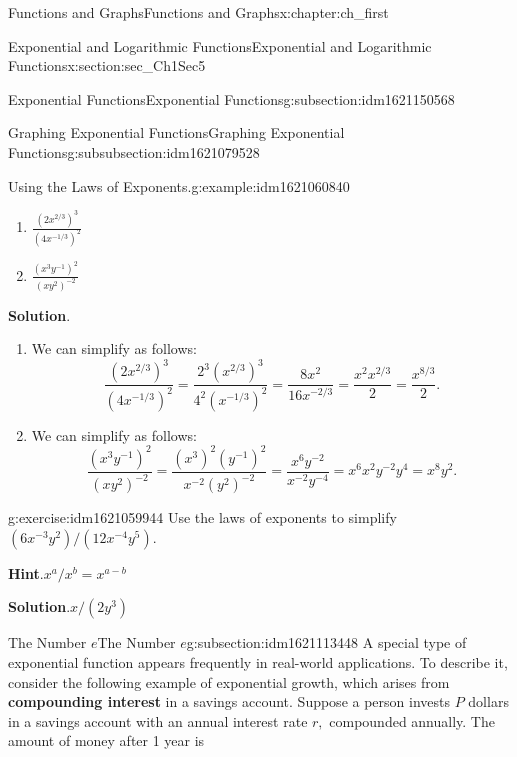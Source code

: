 \documentclass[oneside,10pt,]{book}
\newcommand{\blocktitlefont}{\relax}
\newcommand{\terminology}[1]{\textbf{#1}}
\numberwithin{equation}{section}
\begin{document}
\begin{chapterptx}{Functions and Graphs}{}{Functions and Graphs}{}{}{x:chapter:ch_first}
\begin{sectionptx}{Exponential and Logarithmic Functions}{}{Exponential and Logarithmic Functions}{}{}{x:section:sec_Ch1Sec5}
\begin{subsectionptx}{Exponential Functions}{}{Exponential Functions}{}{}{g:subsection:idm1621150568}
\begin{subsubsectionptx}{Graphing Exponential Functions}{}{Graphing Exponential Functions}{}{}{g:subsubsection:idm1621079528}
\begin{example}{Using the Laws of Exponents.}{g:example:idm1621060840}
\begin{enumerate}
\item{}\(\displaystyle \frac{(2x^{2/3})^3}{(4x^{-1/3})^2}\)%
\item{}\(\displaystyle \frac{(x^3y^{-1})^2}{(xy^2)^{-2}}\)%
\end{enumerate}
\par\smallskip%
\noindent\textbf{\blocktitlefont Solution}.\hypertarget{g:solution:idm1621056104}{}\quad{}%
\begin{enumerate}
\item{}We can simplify as follows:%
\begin{equation*}
\frac{(2x^{2/3})^3}{(4x^{-1/3})^2}= \frac{2^3(x^{2/3})^3}{4^2(x^{-1/3})^2}= \frac{8x^2}{16x^{-2/3}}= \frac{x^2x^{2/3}}{2}= \frac{x^{8/3}}{2}.
\end{equation*}
%
\item{}We can simplify as follows:%
\begin{equation*}
\frac{(x^3y^{-1})^2}{(xy^2)^{-2}}=\frac{(x^3)^2(y^{-1})^2}{x^{-2}(y^2)^{-2}}= \frac{x^6y^{-2}}{x^{-2}y^{-4}}=x^6x^2y^{-2}y^4=x^8y^2.
\end{equation*}
%
\end{enumerate}
\end{example}
\begin{inlineexercise}{}{g:exercise:idm1621059944}%
Use the laws of exponents to simplify \((6x^{-3}y^2)/(12x^{-4}y^5).\)%
\par\smallskip%
\noindent\textbf{\blocktitlefont Hint}.\hypertarget{g:hint:idm1621054824}{}\quad{}\(x^a/x^b=x^{a-b}\)%
\par\smallskip%
\noindent\textbf{\blocktitlefont Solution}.\hypertarget{g:solution:idm1621053672}{}\quad{}\(x/(2y^3)\)%
\end{inlineexercise}%
\end{subsubsectionptx}
\end{subsectionptx}
%
%
\typeout{************************************************}
\typeout{************************************************}
%
\begin{subsectionptx}{The Number \(e \)}{}{The Number \(e \)}{}{}{g:subsection:idm1621113448}
A special type of exponential function appears frequently in real-world applications. To describe it, consider the following example of exponential growth, which arises from \terminology{compounding interest} in a savings account. Suppose a person invests \(P\) dollars in a savings account with an annual interest rate \(r,\) compounded annually. The amount of money after 1 year is%
%
\begin{equation*}

\end{equation*}
\end{subsectionptx}
\end{sectionptx}
\end{chapterptx}
\end{document}
